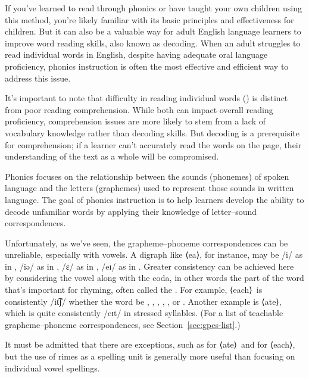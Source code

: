 If you've learned to read through phonics or have taught your own children using this method, you're likely familiar with its basic principles and effectiveness for children. But it can also be a valuable way for adult English language learners to improve word reading skills, also known as decoding. When an adult struggles to read individual words in English, despite having adequate oral language proficiency, phonics instruction is often the most effective and efficient way to address this issue.

It's important to note that difficulty in reading individual words () is distinct from poor reading comprehension. While both can impact overall reading proficiency, comprehension issues are more likely to stem from a lack of vocabulary knowledge rather than decoding skills. But decoding is a prerequisite for comprehension; if a learner can't accurately read the words on the page, their understanding of the text as a whole will be compromised.

Phonics focuses on the relationship between the sounds (phonemes) of spoken language and the letters (graphemes) used to represent those sounds in written language. The goal of phonics instruction is to help learners develop the ability to decode unfamiliar words by applying their knowledge of letter--sound correspondences.

Unfortunately, as we've seen, the grapheme--phoneme correspondences can be unreliable, especially with vowels. A digraph like ⟨ea⟩, for instance, may be /i/ as in , /iə/ as in , /ɛ/ as in , /eɪ/ as in . Greater consistency can be achieved here by considering the vowel along with the coda, in other words the part of the word that's important for rhyming, often called the . For example, ⟨each⟩~is consistently /it͡ʃ/ whether the word be , , , , , or . Another example is ⟨ate⟩, which is quite consistently /eɪt/ in stressed syllables. (For a list of teachable grapheme--phoneme correspondences, see Section~\ref{sec:gpcs-list}.)

It must be admitted that there are exceptions, such as  for ⟨ate⟩~and  for ⟨each⟩, but the use of rimes as a spelling unit is generally more useful than focusing on individual vowel spellings.

